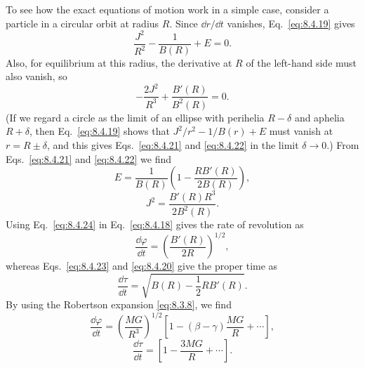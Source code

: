 To see how the exact equations of motion work in a simple case, consider a
particle in a circular orbit at radius \(R\). Since \(\dd r/\dd t\) vanishes,
Eq.~\eqref{eq:8.4.19} gives
\begin{equation}
  \frac{J^2}{R^2}-\frac{1}{B(R)}+E=0.
  \tag{8.4.21}\label{eq:8.4.21}
\end{equation}
Also, for equilibrium at this radius, the derivative at \(R\) of the
left-hand side must also vanish, so
\begin{equation}
  -\frac{2J^2}{R^3}+\frac{B'(R)}{B^2(R)}=0.
  \tag{8.4.22}\label{eq:8.4.22}
\end{equation}
(If we regard a circle as the limit of an ellipse with perihelia
\(R-\delta\) and aphelia \(R+\delta\), then Eq.~\eqref{eq:8.4.19}
shows that \(J^2/r^2-1/B(r)+E\) must vanish at \(r=R\pm\delta\), and
this gives Eqs.~\eqref{eq:8.4.21} and \eqref{eq:8.4.22} in the limit
\(\delta\to0\).) From Eqs.~\eqref{eq:8.4.21} and \eqref{eq:8.4.22}
we find
\begin{equation}
  E
  =
  \frac{1}{B(R)}
  \left(1-\frac{RB'(R)}{2B(R)}\right),
  \tag{8.4.23}\label{eq:8.4.23}
\end{equation}
\begin{equation}
  J^2=\frac{B'(R)R^3}{2B^2(R)}.
  \tag{8.4.24}\label{eq:8.4.24}
\end{equation}
Using Eq.~\eqref{eq:8.4.24} in Eq.~\eqref{eq:8.4.18} gives the rate of
revolution as
\begin{equation}
  \frac{\dd\varphi}{\dd t}
  =
  \left(\frac{B'(R)}{2R}\right)^{1/2},
  \tag{8.4.25}\label{eq:8.4.25}
\end{equation}
whereas Eqs.~\eqref{eq:8.4.23} and \eqref{eq:8.4.20} give the proper
time as
\begin{equation}
  \frac{\dd\tau}{\dd t}
  =
  \sqrt{B(R)-\frac12RB'(R)}.
  \tag{8.4.26}\label{eq:8.4.26}
\end{equation}
By using the Robertson expansion \eqref{eq:8.3.8}, we find
\begin{equation}
  \frac{\dd\varphi}{\dd t}
  =
  \left(\frac{MG}{R^3}\right)^{1/2}
  \left[1-(\beta-\gamma)\frac{MG}{R}+\cdots\right],
  \tag{8.4.27}\label{eq:8.4.27}
\end{equation}
\begin{equation}
  \frac{\dd\tau}{\dd t}
  =
  \left[1-\frac{3MG}{R}+\cdots\right].
  \tag{8.4.28}\label{eq:8.4.28}
\end{equation}

